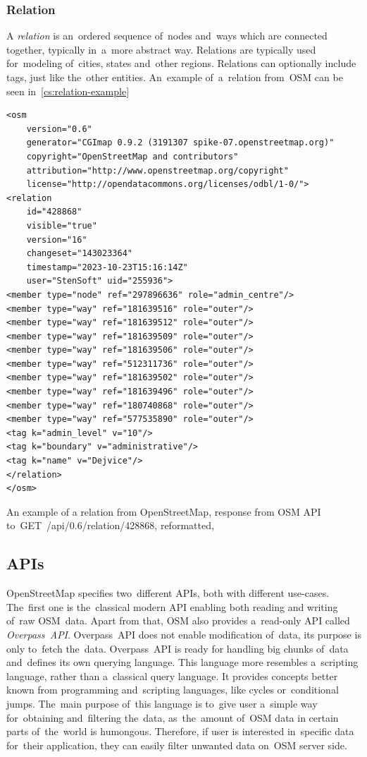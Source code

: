 \subsubsection{Relation}
A \textit{relation} is an~ordered sequence of~nodes and~ways which are connected together, typically in~a~more abstract way. Relations are typically used for~modeling of~cities, states and~other regions. Relations can optionally include tags, just like the~other entities. An~example of~a~relation from~OSM can be seen in~\autoref{cs:relation-example}
\begin{listing}
\begin{verbatim}
<osm
    version="0.6"
    generator="CGImap 0.9.2 (3191307 spike-07.openstreetmap.org)"
    copyright="OpenStreetMap and contributors"
    attribution="http://www.openstreetmap.org/copyright"
    license="http://opendatacommons.org/licenses/odbl/1-0/">
<relation
    id="428868"
    visible="true"
    version="16"
    changeset="143023364"
    timestamp="2023-10-23T15:16:14Z"
    user="StenSoft" uid="255936">
<member type="node" ref="297896636" role="admin_centre"/>
<member type="way" ref="181639516" role="outer"/>
<member type="way" ref="181639512" role="outer"/>
<member type="way" ref="181639509" role="outer"/>
<member type="way" ref="181639506" role="outer"/>
<member type="way" ref="512311736" role="outer"/>
<member type="way" ref="181639502" role="outer"/>
<member type="way" ref="181639496" role="outer"/>
<member type="way" ref="180740868" role="outer"/>
<member type="way" ref="577535890" role="outer"/>
<tag k="admin_level" v="10"/>
<tag k="boundary" v="administrative"/>
<tag k="name" v="Dejvice"/>
</relation>
</osm>
\end{verbatim}
\caption[An example of a relation from OpenStreetMap]{An example of a relation from OpenStreetMap, response from OSM API to~GET~/api/0.6/relation/428868, reformatted,}
\label{cs:relation-example}
\end{listing}
\subsection{APIs}
OpenStreetMap specifies two~different APIs, both with different use-cases. The~first one is the~classical modern API enabling both reading and writing of~raw OSM~data. Apart from that, OSM also provides a~read-only API called \textit{Overpass~API}. Overpass~API does not enable modification of~data, its purpose is only to~fetch the~data. Overpass~API is ready for handling big chunks of~data and~defines its own querying language. This language more resembles a~scripting language, rather than a~classical query language. It provides concepts better known from programming and~scripting languages, like cycles or~conditional jumps. The~main purpose of~this language is to~give user a~simple way for~obtaining and~filtering the~data, as~the~amount of~OSM data in certain parts of~the~world is humongous. Therefore, if user is interested in~specific data for~their application, they can easily filter unwanted data on~OSM server side.
